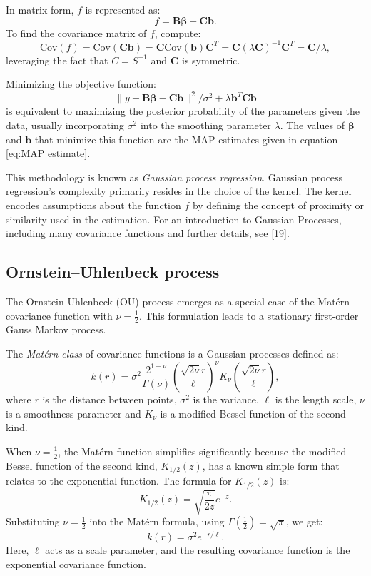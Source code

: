 \documentclass[
11pt, %
oneside, %
english, %
singlespacing, %
]{macthesis} %
\begin{document}
In matrix form, \(f\) is represented as:
\[
f = \mathbf{B} \boldsymbol{\beta} + \mathbf{C}\mathbf{b}.
\]
To find the covariance matrix of \(f\), compute:
\[
\text{Cov}(f) = \text{Cov}(\mathbf{C}\mathbf{b}) = \mathbf{C} \text{Cov}(\mathbf{b}) \mathbf{C}^T = \mathbf{C} (\lambda \mathbf{C})^{-1} \mathbf{C}^T = \mathbf{C} / \lambda,
\]
leveraging the fact that \(C = S^{-1}\) and \(\mathbf{C}\) is symmetric.

Minimizing the objective function:
\[
\|y - \mathbf{B}\boldsymbol{\beta} - \mathbf{C}\mathbf{b}\|^2/\sigma^2 + \lambda \mathbf{b}^T \mathbf{C} \mathbf{b}
\]
is equivalent to maximizing the posterior probability of the parameters given the data, usually incorporating \(\sigma^2\) into the smoothing parameter \(\lambda\). The values of \(\boldsymbol{\beta}\) and \(\mathbf{b}\) that minimize this function are the MAP estimates given in equation \ref{eq:MAP estimate}.

This methodology is known as \emph{Gaussian process regression}. Gaussian process regression's complexity primarily resides in the choice of the kernel. The kernel encodes assumptions about the function \(f\) by defining the concept of proximity or similarity used in the estimation. For an introduction to Gaussian Processes, including many covariance functions and further details, see {[}19{]}.

\subsection{Ornstein--Uhlenbeck process}\label{OU}

The Ornstein-Uhlenbeck (OU) process emerges as a special case of the Matérn covariance function with \(\nu = \frac{1}{2}\). This formulation leads to a stationary first-order Gauss Markov process.

The \emph{Matérn class} of covariance functions is a Gaussian processes defined as:
\[
k(r) = \sigma^2 \frac{2^{1-\nu}}{\Gamma(\nu)}\left(\frac{\sqrt{2\nu} r}{\ell}\right)^\nu K_\nu\left(\frac{\sqrt{2\nu} r}{\ell}\right),
\]
where \(r\) is the distance between points, \(\sigma^2\) is the variance, \(\ell\) is the length scale, \(\nu\) is a smoothness parameter and \(K_\nu\) is a modified Bessel function of the second kind.

When \(\nu = \frac{1}{2}\), the Matérn function simplifies significantly because the modified Bessel function of the second kind, \(K_{1/2}(z)\), has a known simple form that relates to the exponential function. The formula for \(K_{1/2}(z)\) is:
\[
K_{1/2}(z) = \sqrt{\frac{\pi}{2z}} e^{-z}.
\]
Substituting \(\nu = \frac{1}{2}\) into the Matérn formula, using \(\Gamma(\frac{1}{2}) = \sqrt{\pi}\), we get:
\[
k(r) = \sigma^2 e^{-r/\ell}.
\]
Here, \(\ell\) acts as a scale parameter, and the resulting covariance function is the exponential covariance function.
\end{document}
